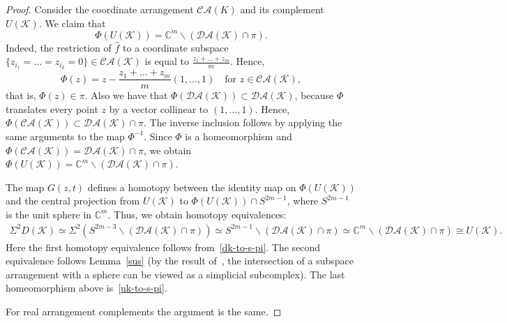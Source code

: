 \documentclass[a4paper,12pt]{amsart}
\newcommand{\K}{\mathcal K}
\newcommand{\CC}{\mathbb C}
\theoremstyle{definition}
\theoremstyle{remark}
\numberwithin{equation}{section}
\begin{document}
\begin{proof}
Consider the coordinate arrangement $\mathcal{CA}(K)$ and its complement $U(\K)$. We claim that 
\begin{equation}\label{uk-to-s-pi}
  \Phi(U(\K)) = \CC^m \backslash \left({ \mathcal{DA}(\K) \cap \pi }\right).
\end{equation}
Indeed, the restriction of $\widehat f$ to a coordinate subspace $\{z_{i_1} = \dots = z_{i_k} = 0 \}\in\mathcal{CA}(\K)$  is equal to $\frac{z_1 + \dots + z_m}{m}$. Hence,
\[
  \Phi(z) = z - \frac{z_1 + \dots + z_m}{m} (1, \dots, 1)
  \quad\text{for } z \in \mathcal{CA}(\K),
\]  
that is, $\Phi(z) \in \pi$. Also we have that $\Phi(\mathcal{DA}(\K)) \subset \mathcal{DA}(\K)$,	because $\Phi$ translates every point $z$ by a vector collinear to $(1, \dots, 1)$.
	Hence, $\Phi(\mathcal{CA}(\K) ) \subset \mathcal{DA}(\K) \cap \pi$.
	The inverse inclusion follows by applying the same arguments to the map $\Phi^{-1}$. 
	Since $\Phi$ is a homeomorphism and
	$\Phi(\mathcal{CA}(\K)) = \mathcal{DA}(\K) \cap \pi$, we obtain
	$\Phi(U(\K)) = \CC^m \backslash \left({ \mathcal{DA}(\K) \cap \pi }\right)$.
	
	The map $G(z, t)$ defines a homotopy between the identity map on $\Phi(U(\K))$ and the central projection
	from $U(\K)$ to $\Phi(U(\K)) \cap S^{2m-1}$, where $S^{2m-1}$ is the unit sphere in $\CC^m$. 
	Thus, we obtain homotopy equivalences:
\begin{multline*}
    \Sigma^2 D(\K) \simeq \Sigma^2(S^{2m-3} \backslash
    (\mathcal{DA}(\K) \cap \pi))
    \simeq S^{2m-1} \backslash(\mathcal{DA}(\K) \cap \pi)
    \simeq \CC^m \backslash (\mathcal{DA}(\K) \cap \pi) \cong U(\K).
\end{multline*}
Here the first homotopy equivalence follows from~\eqref{dk-to-s-pi}. The second equivalence follows Lemma~\ref{sus} (by the result of~\cite{BjZ}, the intersection %
of a subspace arrangement with a sphere can be viewed as a simplicial subcomplex). The last homeomorphism above is~\eqref{uk-to-s-pi}.
	
For real arrangement complements the argument is the same.
\end{proof}
\end{document}
